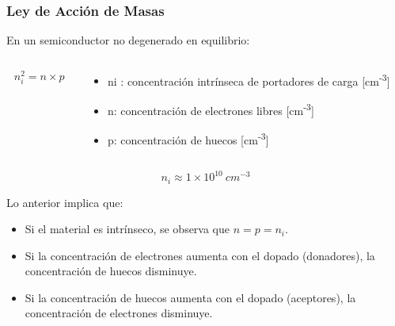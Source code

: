 \documentclass[10pt,t,aspectratio=169]{beamer}
\begin{document}
\begin{frame}
  \frametitle{Ley de Acción de Masas}

  En un semiconductor no degenerado en equilibrio:

  \begin{columns}
    \begin{column}{0.3\textwidth}
      \[ n_i^2 = n\times{}p \]
    \end{column}
    \begin{column}{0.7\textwidth}
      \begin{itemize}
        \item ni : concentración intrínseca de portadores de carga [cm\textsuperscript{-3}]
        \item n: concentración de electrones libres [cm\textsuperscript{-3}]
        \item p: concentración de huecos [cm\textsuperscript{-3}]
      \end{itemize}
    \end{column}
  \end{columns}

  \vspace{5mm}
  \[ n_i \approx 1\times{}10^{10}\ cm^{-3} \]
  
  \vspace{5mm}
  Lo anterior implica que:

  \begin{itemize}
    \item Si el material es intrínseco, se observa que $n=p=n_i$.
    \item Si la concentración de electrones aumenta con el dopado (donadores), la concentración de huecos disminuye.
    \item Si la concentración de huecos aumenta con el dopado (aceptores), la concentración de electrones disminuye.
  \end{itemize}
\end{frame}
\end{document}
